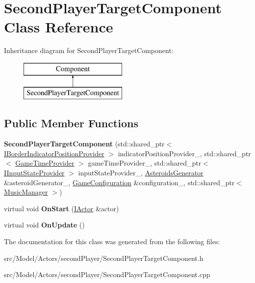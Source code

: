 \hypertarget{classSecondPlayerTargetComponent}{}\section{Second\+Player\+Target\+Component Class Reference}
\label{classSecondPlayerTargetComponent}
Inheritance diagram for Second\+Player\+Target\+Component\+:\begin{figure}[H]
\begin{center}
\leavevmode
\includegraphics[height=2.000000cm]{classSecondPlayerTargetComponent}
\end{center}
\end{figure}
\subsection*{Public Member Functions}
\begin{DoxyCompactItemize}
\item 
{\bfseries Second\+Player\+Target\+Component} (std\+::shared\+\_\+ptr$<$ \hyperlink{classIBorderIndicatorPositionProvider}{I\+Border\+Indicator\+Position\+Provider} $>$ indicator\+Position\+Provider\+\_\+, std\+::shared\+\_\+ptr$<$ \hyperlink{classGameTimeProvider}{Game\+Time\+Provider} $>$ game\+Time\+Provider\+\_\+, std\+::shared\+\_\+ptr$<$ \hyperlink{classIInputStateProvider}{I\+Input\+State\+Provider} $>$ input\+State\+Provider\+\_\+, \hyperlink{classAsteroidsGenerator}{Asteroids\+Generator} \&asteroid\+Generator\+\_\+, \hyperlink{classGameConfiguration}{Game\+Configuration} \&configuration\+\_\+, std\+::shared\+\_\+ptr$<$ \hyperlink{classMusicManager}{Music\+Manager} $>$)\hypertarget{classSecondPlayerTargetComponent_a47e0727bf2cd4a70d4527df6b5ad285f}{}\label{classSecondPlayerTargetComponent_a47e0727bf2cd4a70d4527df6b5ad285f}

\item 
virtual void {\bfseries On\+Start} (\hyperlink{classIActor}{I\+Actor} \&actor)\hypertarget{classSecondPlayerTargetComponent_a695729eafa2fc5f8db64c7c496852d27}{}\label{classSecondPlayerTargetComponent_a695729eafa2fc5f8db64c7c496852d27}

\item 
virtual void {\bfseries On\+Update} ()\hypertarget{classSecondPlayerTargetComponent_a8844f07901cc72f44eb12c0968b07820}{}\label{classSecondPlayerTargetComponent_a8844f07901cc72f44eb12c0968b07820}

\end{DoxyCompactItemize}


The documentation for this class was generated from the following files\+:\begin{DoxyCompactItemize}
\item 
src/\+Model/\+Actors/second\+Player/Second\+Player\+Target\+Component.\+h\item 
src/\+Model/\+Actors/second\+Player/Second\+Player\+Target\+Component.\+cpp\end{DoxyCompactItemize}
